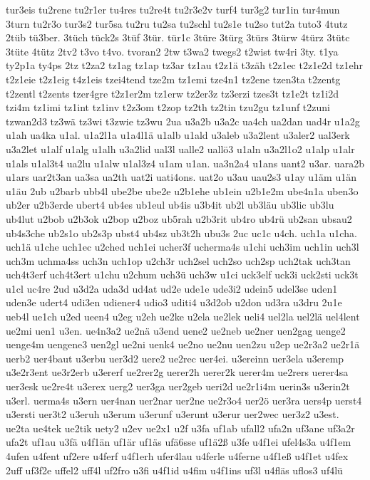 {tur3eis
tu2rene
tu2r1er
tu4res
tu2re4t
tu2r3e2v
turf4
tur3g2
tur1in
tur4mun
3turn
tu2r3o
tur3s2
tur5sa
tu2ru
tu2sa
tu2schl
tu2s1e
tu2so
tut2a
tuto3
4tutz
2tüb
tü3ber.
3tüch
tück2s
3tüf
3tür.
tür1c
3türe
3türg
3türs
3türw
4türz
3tütc
3tüte
4tütz
2tv2
t3vo
t4vo.
tvoran2
2tw
t3wa2
twegs2
t2wist
tw4ri
3ty.
t1ya
ty2p1a
ty4ps
2tz
t2za2
tz1ag
tz1ap
tz3ar
tz1au
t2z1ä
t3zäh
t2z1ec
t2z1e2d
tz1ehr
t2z1eie
t2z1eig
t4z1eis
tzei4tend
tze2m
tz1emi
tze4n1
tz2ene
tzen3ta
t2zentg
t2zentl
t2zents
tzer4gre
t2z1er2m
tz1erw
tz2er3z
tz3erzi
tzes3t
tz1e2t
tz1i2d
tzi4m
tz1imi
tz1int
tz1inv
t2z3om
t2zop
tz2th
tz2tin
tzu2gu
tz1unf
t2zuni
tzwan2d3
tz3wä
tz3wi
t3zwie
tz3wu
2ua
u3a2b
u3a2c
ua4ch
ua2dan
uad4r
u1a2g
u1ah
ua4ka
u1al.
u1a2l1a
u1a4l1ä
u1alb
u1ald
u3aleb
u3a2lent
u3aler2
ual3erk
u3a2let
u1alf
u1alg
u1alh
u3a2lid
ual3l
ualle2
uallö3
u1aln
u3a2l1o2
u1alp
u1alr
u1als
u1al3t4
ua2lu
u1alw
u1al3z4
u1am
u1an.
ua3n2a4
u1ans
uant2
u3ar.
uara2b
u1ars
uar2t3an
ua3sa
ua2th
uat2i
uati4ons.
uat2o
u3au
uau2s3
u1ay
u1äm
u1än
u1äu
2ub
u2barb
ubb4l
ube2be
ube2e
u2b1ehe
ub1ein
u2b1e2m
ube4n1a
uben3o
ub2er
u2b3erde
ubert4
ub4es
ub1eul
ub4is
u3b4it
ub2l
ub3läu
ub3lic
ub3lu
ub4lut
u2bob
u2b3ok
u2bop
u2boz
ub5rah
u2b3rit
ub4ro
ub4rü
ub2san
ubsau2
ub4s3che
ub2s1o
ub2s3p
ubst4
ub4sz
ub3t2h
ubu3s
2uc
uc1c
u4ch.
uch1a
u1cha.
uch1ä
u1che
uch1ec
u2ched
uch1ei
ucher3f
ucherma4s
u1chi
uch3im
uch1in
uch3l
uch3m
uchma4ss
uch3n
uch1op
u2ch3r
uch2sel
uch2so
uch2sp
uch2tak
uch3tan
uch4t3erf
uch4t3ert
u1chu
u2chum
uch3ü
uch3w
u1ci
uck3elf
uck3i
uck2sti
uck3t
u1cl
uc4re
2ud
u3d2a
uda3d
ud4at
ud2e
ude1e
ude3i2
udein5
udel3se
uden1
uden3e
udert4
udi3en
udiener4
udio3
uditi4
u3d2ob
u2don
ud3ra
u3dru
2u1e
ueb4l
ue1ch
u2ed
ueen4
u2eg
u2eh
ue2ke
u2ela
ue2lek
ueli4
uel2la
uel2lä
uel4lent
ue2mi
uen1
u3en.
ue4n3a2
ue2nä
u3end
uene2
ue2neb
ue2ner
uen2gag
uenge2
uenge4m
uengene3
uen2gl
ue2ni
uenk4
ue2no
ue2nu
uen2zu
u2ep
ue2r3a2
ue2r1ä
uerb2
uer4baut
u3erbu
uer3d2
uere2
ue2rec
uer4ei.
u3ereinn
uer3ela
u3eremp
u3e2r3ent
ue3r2erb
u3ererf
ue2rer2g
uerer2h
uerer2k
uerer4m
ue2rers
uerer4sa
uer3esk
ue2re4t
u3erex
uerg2
uer3ga
uer2geb
ueri2d
ue2r1i4m
uerin3s
u3erin2t
u3erl.
uerma4s
u3ern
uer4nan
uer2nar
uer2ne
ue2r3o4
uer2ö
uer3ra
uers4p
uerst4
u3ersti
uer3t2
u3eruh
u3erum
u3erunf
u3erunt
u3erur
uer2wec
uer3z2
u3est.
ue2ta
ue4tek
ue2tik
uety2
u2ev
ue2x1
u2f
u3fa
uf1ab
ufall2
ufa2n
uf3ane
uf3a2r
ufa2t
uf1au
u3fä
u4f1än
uf1är
uf1äs
ufä6sse
uf1ä2ß
u3fe
u4f1ei
ufel4s3a
u4f1em
4ufen
u4fent
uf2ere
u4ferf
u4f1erh
ufer4lau
u4ferle
u4ferne
u4f1eß
u4f1et
u4fex
2uff
uf3f2e
uffel2
uff4l
uf2fro
u3fi
u4f1id
u4fim
u4f1ins
uf3l
u4fläs
uflos3
uf4lü
}
